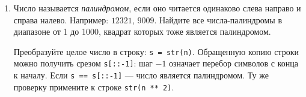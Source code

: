 \documentclass[a4,12pt]{article}
\theoremstyle{remark}
\begin{document}
\begin{enumerate}
\begin{exercisehint}
    Алгоритм работает со строковыми представлениями числа и его квадрата.
    Количество цифр числа \texttt{n} равно \texttt{k = len(str(n))}.
    Последние \texttt{k} цифр квадрата можно получить срезом
    \texttt{str(n ** 2)[-k:]}: отрицательный индекс отсчитывает
    символы с конца строки.
    Если \texttt{str(n ** 2)[-k:] == str(n)} ---
    число является автоморфным.
\end{exercisehint}

\item Число называется \emph{палиндромом}, если оно читается одинаково
слева направо и справа налево. Например: $12321$, $9009$.
Найдите все числа-палиндромы в диапазоне от 1 до 1000,
квадрат которых тоже является палиндромом.

\begin{exercisehint}
    Преобразуйте целое число в строку: \texttt{s = str(n)}.
    Обращенную копию строки можно получить срезом \texttt{s[::-1]}:
    шаг $-1$ означает перебор символов с конца к началу.
    Если \texttt{s == s[::-1]} --- число является палиндромом.
    Ту же проверку примените к строке \texttt{str(n ** 2)}.
\end{exercisehint}

\end{enumerate}
\end{document}
